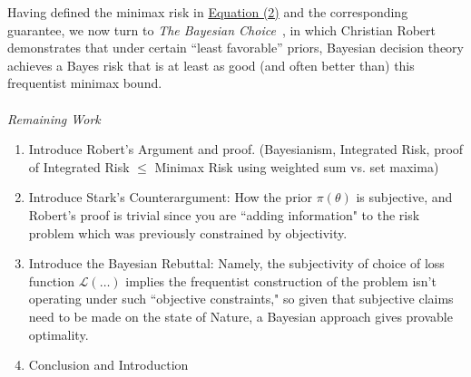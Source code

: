 \documentclass[letterpaper,12pt]{article}
\begin{document}
Having defined the minimax risk in \hyperref[eq:minimaxrisk]{Equation (2)} and the corresponding guarantee, we now turn to \textit{The Bayesian Choice} \cite{robert2007bayesian}, in which Christian Robert demonstrates that under certain “least favorable” priors, Bayesian decision theory achieves a Bayes risk that is at least as good (and often better than) this frequentist minimax bound.
\\ \\ 
\textit{Remaining Work}
\begin{enumerate}\item{Introduce Robert's Argument and proof. (Bayesianism, Integrated Risk, proof of Integrated Risk $\leq$ Minimax Risk using weighted sum vs. set maxima)} 
\item{Introduce Stark's Counterargument: How the prior $\pi(\theta)$ is subjective, and Robert's proof is trivial since you are ``adding information" to the risk problem which was previously constrained by objectivity.}
\item{Introduce the Bayesian Rebuttal: Namely, the subjectivity of choice of loss function $\mathcal{L}(\dots)$ implies the frequentist construction of the problem isn't operating under such ``objective constraints," so given that subjective claims need to be made on the state of Nature, a Bayesian approach gives provable optimality. }
\item{Conclusion and Introduction }
 \end{enumerate}
\end{document}

